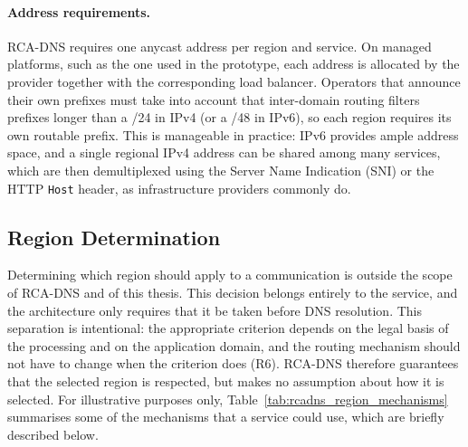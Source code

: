 \documentclass[
A4paper,                %
twoside,                %
openright,              %
chapterprefix=true,     %
12pt,                   %
headings=normal,        %
titlepage=on            %
]{book}
\begin{document}
\paragraph{Address requirements.} RCA-DNS requires one anycast address per region and service. On managed platforms, such as the one used in the prototype, each address is allocated by the provider together with the corresponding load balancer. Operators that announce their own prefixes must take into account that inter-domain routing filters prefixes longer than a /24 in IPv4 (or a /48 in IPv6), so each region requires its own routable prefix. This is manageable in practice: IPv6 provides ample address space, and a single regional IPv4 address can be shared among many services, which are then demultiplexed using the Server Name Indication (SNI) or the HTTP \texttt{Host} header, as infrastructure providers commonly do.

\subsection{Region Determination}
\label{sc:rcadns_region_determination}

Determining which region should apply to a communication is outside the scope of RCA-DNS and of this thesis. This decision belongs entirely to the service, and the architecture only requires that it be taken before DNS resolution. This separation is intentional: the appropriate criterion depends on the legal basis of the processing and on the application domain, and the routing mechanism should not have to change when the criterion does (R6). RCA-DNS therefore guarantees that the selected region is respected, but makes no assumption about how it is selected. For illustrative purposes only, Table~\ref{tab:rcadns_region_mechanisms} summarises some of the mechanisms that a service could use, which are briefly described below.
\end{document}

